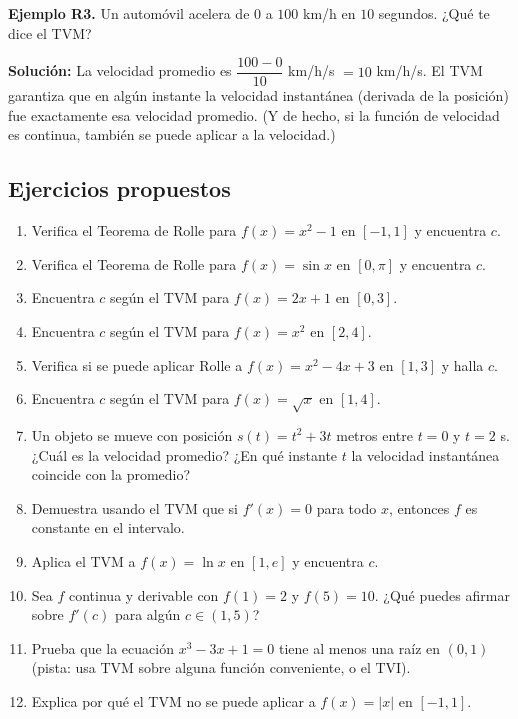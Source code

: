 \documentclass[12pt, letterpaper]{article}
\begin{document}
\textbf{Ejemplo R3.} Un automóvil acelera de $0$ a $100$ km/h en $10$ segundos. ¿Qué te dice el TVM?

\begin{cuadrosolucion}
  \textbf{Solución:} La velocidad promedio es $\dfrac{100 - 0}{10}$ km/h/s $= 10$ km/h/s. El TVM garantiza que en algún instante la velocidad instantánea (derivada de la posición) fue exactamente esa velocidad promedio. (Y de hecho, si la función de velocidad es continua, también se puede aplicar a la velocidad.)
\end{cuadrosolucion}

\subsection{Ejercicios propuestos}

\begin{enumerate}[resume=ejercicios, leftmargin=*]
  \item \facil{} Verifica el Teorema de Rolle para $f(x) = x^2 - 1$ en $[-1, 1]$ y encuentra $c$.

  \item \facil{} Verifica el Teorema de Rolle para $f(x) = \sin x$ en $[0, \pi]$ y encuentra $c$.

  \item \facil{} Encuentra $c$ según el TVM para $f(x) = 2x + 1$ en $[0, 3]$.

  \item \facil{} Encuentra $c$ según el TVM para $f(x) = x^2$ en $[2, 4]$.

  \item \medio{} Verifica si se puede aplicar Rolle a $f(x) = x^2 - 4x + 3$ en $[1, 3]$ y halla $c$.

  \item \medio{} Encuentra $c$ según el TVM para $f(x) = \sqrt{x}$ en $[1, 4]$.

  \item \medio{} Un objeto se mueve con posición $s(t) = t^2 + 3t$ metros entre $t = 0$ y $t = 2$ s. ¿Cuál es la velocidad promedio? ¿En qué instante $t$ la velocidad instantánea coincide con la promedio?

  \item \medio{} Demuestra usando el TVM que si $f'(x) = 0$ para todo $x$, entonces $f$ es constante en el intervalo.

  \item \dificil{} Aplica el TVM a $f(x) = \ln x$ en $[1, e]$ y encuentra $c$.

  \item \dificil{} Sea $f$ continua y derivable con $f(1) = 2$ y $f(5) = 10$. ¿Qué puedes afirmar sobre $f'(c)$ para algún $c \in (1, 5)$?

  \item \dificil{} Prueba que la ecuación $x^3 - 3x + 1 = 0$ tiene al menos una raíz en $(0, 1)$ (pista: usa TVM sobre alguna función conveniente, o el TVI).

  \item \dificil{} Explica por qué el TVM no se puede aplicar a $f(x) = |x|$ en $[-1, 1]$.
\end{enumerate}
\end{document}
